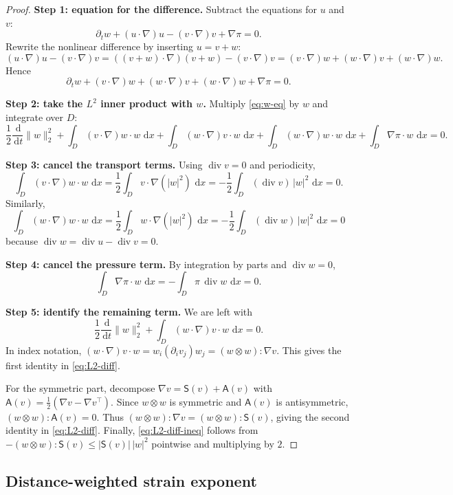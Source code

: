 \documentclass{article}
\numberwithin{equation}{section}
\theoremstyle{plain}
\theoremstyle{definition}
\theoremstyle{remark}
\newcommand{\dd}{\,\mathrm{d}}
\DeclareMathOperator{\divg}{div}
\begin{document}
\begin{proof}
\textbf{Step 1: equation for the difference.}
Subtract the equations for $u$ and $v$:
\[
\partial_t w + (u\cdot\nabla)u - (v\cdot\nabla)v + \nabla\pi = 0.
\]
Rewrite the nonlinear difference by inserting $u=v+w$:
\[
(u\cdot\nabla)u - (v\cdot\nabla)v
= ((v+w)\cdot\nabla)(v+w) - (v\cdot\nabla)v
= (v\cdot\nabla)w + (w\cdot\nabla)v + (w\cdot\nabla)w.
\]
Hence
\begin{equation}\label{eq:w-eq}
\partial_t w + (v\cdot\nabla)w + (w\cdot\nabla)v + (w\cdot\nabla)w + \nabla\pi = 0.
\end{equation}

\textbf{Step 2: take the $L^2$ inner product with $w$.}
Multiply \eqref{eq:w-eq} by $w$ and integrate over $D$:
\[
\frac12\frac{\dd}{\dd t}\|w\|_2^2
+\int_D (v\cdot\nabla)w\cdot w\,\dd x
+\int_D (w\cdot\nabla)v\cdot w\,\dd x
+\int_D (w\cdot\nabla)w\cdot w\,\dd x
+\int_D \nabla\pi\cdot w\,\dd x
=0.
\]

\textbf{Step 3: cancel the transport terms.}
Using $\divg v=0$ and periodicity,
\[
\int_D (v\cdot\nabla)w\cdot w\,\dd x
=\frac12\int_D v\cdot\nabla(|w|^2)\,\dd x
=-\frac12\int_D (\divg v)\,|w|^2\,\dd x=0.
\]
Similarly,
\[
\int_D (w\cdot\nabla)w\cdot w\,\dd x
=\frac12\int_D w\cdot\nabla(|w|^2)\,\dd x
=-\frac12\int_D (\divg w)\,|w|^2\,\dd x=0
\]
because $\divg w=\divg u-\divg v=0$.

\textbf{Step 4: cancel the pressure term.}
By integration by parts and $\divg w=0$,
\[
\int_D \nabla\pi\cdot w\,\dd x = -\int_D \pi\,\divg w\,\dd x=0.
\]

\textbf{Step 5: identify the remaining term.}
We are left with
\[
\frac12\frac{\dd}{\dd t}\|w\|_2^2 + \int_D (w\cdot\nabla)v\cdot w\,\dd x=0.
\]
In index notation, $(w\cdot\nabla)v\cdot w = w_i(\partial_i v_j)w_j=(w\otimes w):\nabla v$.
This gives the first identity in \eqref{eq:L2-diff}.

For the symmetric part, decompose $\nabla v=\mathsf S(v)+\mathsf A(v)$ with $\mathsf A(v)=\tfrac12(\nabla v-\nabla v^\top)$.
Since $w\otimes w$ is symmetric and $\mathsf A(v)$ is antisymmetric, $(w\otimes w):\mathsf A(v)=0$.
Thus $(w\otimes w):\nabla v=(w\otimes w):\mathsf S(v)$, giving the second identity in \eqref{eq:L2-diff}.
Finally, \eqref{eq:L2-diff-ineq} follows from $-(w\otimes w):\mathsf S(v)\le | \mathsf S(v)|\,|w|^2$ pointwise and multiplying by $2$.
\end{proof}

\subsection{Distance-weighted strain exponent}
\end{document}
